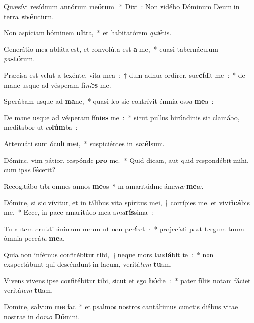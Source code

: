 ﻿\item Quæsívi resíduum annórum me\textbf{ó}rum.~* Dixi~: Non vidébo Dóminum Deum in terra \emph{vi}\textbf{vén}tium.
\item Non aspíciam hóminem \textbf{ul}tra,~* et habitatórem \emph{qui}\textbf{é}tis.
\item Generátio mea abláta est, et convolúta est \textbf{a} me,~* quasi tabernáculum \emph{pa}\textbf{stó}rum.
\item Præcísa est velut a texénte, vita mea~:~† dum adhuc ordírer, suc\textbf{cí}dit me~:~* de mane usque ad vésperam fí\emph{ni}\textbf{es} me.
\item Sperábam usque ad \textbf{ma}ne,~* quasi leo sic contrívit ómnia os\emph{sa} \textbf{me}a~:
\item De mane usque ad vésperam fíni\textbf{es} me~:~* sicut pullus hirúndinis sic clamábo, meditábor ut \emph{co}\textbf{lúm}ba~:
\item Attenuáti sunt óculi \textbf{me}i,~* suspiciéntes in \emph{ex}\textbf{cél}sum.
\item Dómine, vim pátior, respónde \textbf{pro} me.~* Quid dicam, aut quid respondébit mihi, cum ip\emph{se} \textbf{fé}cerit?
\item Recogitábo tibi omnes annos \textbf{me}os~* in amaritúdine áni\emph{mæ} \textbf{me}æ.
\item Dómine, si sic vívitur, et in tálibus vita spíritus mei,~† corrípies me, et vivifi\textbf{cá}bis me.~* Ecce, in pace amaritúdo mea a\emph{ma}\textbf{rís}sima~:
\item Tu autem eruísti ánimam meam ut non per\textbf{í}ret~:~* projecísti post tergum tuum ómnia peccá\emph{ta} \textbf{me}a.
\item Quia non inférnus confitébitur tibi,~† neque mors lau\textbf{dá}bit te~:~* non exspectábunt qui descéndunt in lacum, veritá\emph{tem} \textbf{tu}am.
\item Vivens vivens ipse confitébitur tibi, sicut et ego \textbf{hó}die~:~* pater fíliis notam fáciet veritá\emph{tem} \textbf{tu}am.
\item Domine, salvum \textbf{me} fac~* et psalmos nostros cantábimus cunctis diébus vitae nostrae in do\emph{mo} \textbf{Dó}mini.